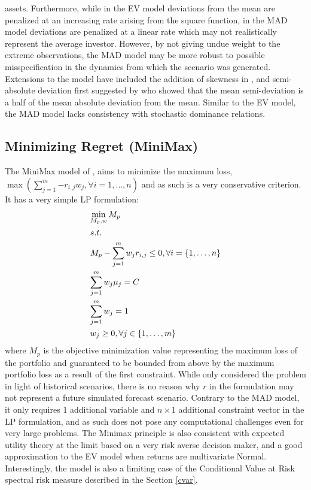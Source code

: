 assets. Furthermore, while in the EV model deviations from the mean are
penalized at an increasing rate arising from the square function, in the MAD
model deviations are penalized at a linear rate which may not realistically
represent the average investor. However, by not giving undue weight to the
extreme observations, the MAD model may be more robust to possible
misspecification in the dynamics from which the scenario was generated.
Extensions to the model have included the addition of skewness in
, and semi-absolute deviation first suggested by
 who showed that the mean semi-deviation is a half
of the mean absolute deviation from the mean. Similar to the EV model, the
MAD model lacks consistency with stochastic dominance relations.
\subsection{Minimizing Regret (MiniMax)}
The MiniMax model of , aims to minimize the maximum loss,
$\max \left( {\sum\limits_{j=1}^m {- {r_{i,j}}{w_j}} ,\forall i=1,\dots,n} \right)$
and as such is a very conservative criterion. It has a very simple LP formulation:
\begin{equation}\label{eq:minimax}
\begin{gathered}
  \mathop {\min }\limits_{{M_p},w} {M_p} \hfill \\
  s.t. \hfill \\
  {M_p} - \sum\limits_{j=1}^m {{w_j}} {r_{i,j}} \leq 0,\forall i=\left\{ {1,\dots,n} \right\} \hfill \\
  \sum\limits_{j=1}^m {{w_j}{\mu _j}=C}  \hfill \\
  \sum\limits_{j=1}^m {{w_j}=1}  \hfill \\
  {w_j} \geq 0,\forall j \in \left\{ {1,\dots,m} \right\} \hfill \\
\end{gathered}
\end{equation}
where $M_p$ is the objective minimization value representing the maximum loss
of the portfolio and guaranteed to be bounded from above by the maximum
portfolio loss as a result of the first constraint. While
 only considered the problem in light of historical
scenarios, there is no reason why $r$ in the formulation may not represent a
future simulated forecast scenario. Contrary to the MAD model, it only
requires 1 additional variable and $n\times 1$ additional constraint vector
in the LP formulation, and as such does not pose any computational challenges
even for very large problems. The Minimax principle is also consistent with
expected utility theory at the limit based on a very risk averse decision
maker, and a good approximation to the EV model when returns are multivariate
Normal. Interestingly, the model is also a limiting case of the Conditional
Value at Risk spectral risk measure described in the Section \ref{cvar}.
